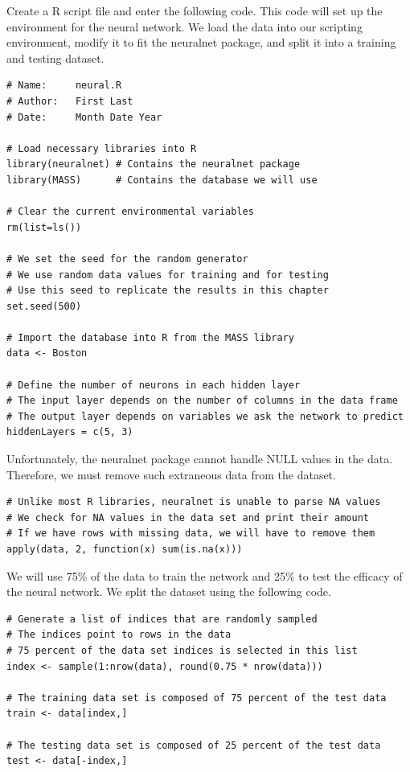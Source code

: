 Create a R script file and enter the following code. This code will set up the environment for the neural network. We load the data into our scripting environment, modify it to fit the neuralnet package, and split it into a training and testing dataset. 
\begin{lstlisting}
# Name:     neural.R
# Author:   First Last
# Date:     Month Date Year

# Load necessary libraries into R
library(neuralnet) # Contains the neuralnet package
library(MASS)      # Contains the database we will use

# Clear the current environmental variables
rm(list=ls())

# We set the seed for the random generator
# We use random data values for training and for testing
# Use this seed to replicate the results in this chapter
set.seed(500)

# Import the database into R from the MASS library
data <- Boston

# Define the number of neurons in each hidden layer
# The input layer depends on the number of columns in the data frame
# The output layer depends on variables we ask the network to predict
hiddenLayers = c(5, 3)
\end{lstlisting}

Unfortunately, the neuralnet package cannot handle NULL values in the data.
Therefore, we must remove such extraneous data from the dataset.

\begin{lstlisting}
# Unlike most R libraries, neuralnet is unable to parse NA values
# We check for NA values in the data set and print their amount
# If we have rows with missing data, we will have to remove them
apply(data, 2, function(x) sum(is.na(x)))
\end{lstlisting}

We will use 75\% of the data to train the network and 25\% to test the efficacy of the neural network.
We split the dataset using the following code.

\begin{lstlisting}
# Generate a list of indices that are randomly sampled
# The indices point to rows in the data
# 75 percent of the data set indices is selected in this list
index <- sample(1:nrow(data), round(0.75 * nrow(data)))

# The training data set is composed of 75 percent of the test data
train <- data[index,]

# The testing data set is composed of 25 percent of the test data
test <- data[-index,]
\end{lstlisting}

